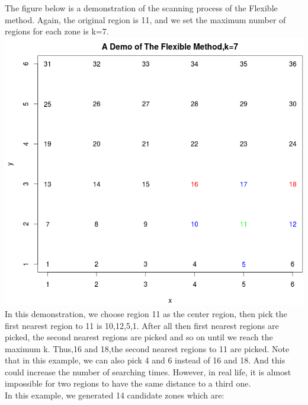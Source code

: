 \documentclass[12pt]{article}
\begin{document}
\begin{enumerate}
	The figure below is a demonstration of the scanning process of the Flexible method. Again, the original region is 11, and we set the maximum number of regions for each zone is k=7.\\
	\includegraphics[scale=0.5]{demo_3} \\
	In this demonstration, we choose region 11 as the center region, then pick the first nearest region to 11 is 10,12,5,1. After all then first nearest regions are picked, the second nearest regions are picked and so on until we reach the maximum k. Thus,16 and 18,the second nearest regions to 11 are picked. Note that in this example, we can also pick 4 and 6 instead of 16 and 18. And this could increase the number of searching times. However, in real life, it is almost impossible for two regions to have the same distance to a third one. \\  
	
	In this example, we generated 14 candidate zones which are: \\
	
	
		

\end{enumerate}
\end{document}

